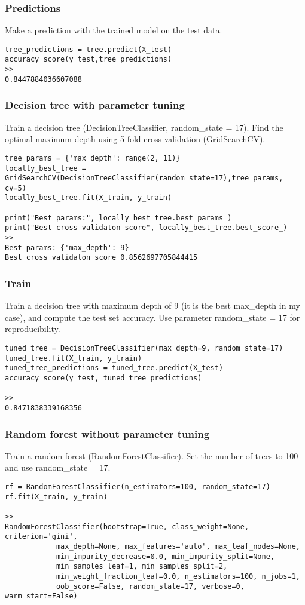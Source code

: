 \begin{frame}[fragile]\frametitle{Predictions}	
Make a prediction with the trained model on the test data.
\begin{lstlisting}
tree_predictions = tree.predict(X_test) 
accuracy_score(y_test,tree_predictions)
>>
0.8447884036607088
\end{lstlisting}
\end{frame}


\begin{frame}[fragile]\frametitle{Decision tree with parameter tuning}	
Train a decision tree (DecisionTreeClassifier, random\_state = 17). Find the optimal maximum depth using 5-fold cross-validation (GridSearchCV).
\begin{lstlisting}
tree_params = {'max_depth': range(2, 11)}
locally_best_tree = GridSearchCV(DecisionTreeClassifier(random_state=17),tree_params, cv=5)                  
locally_best_tree.fit(X_train, y_train)

print("Best params:", locally_best_tree.best_params_)
print("Best cross validaton score", locally_best_tree.best_score_)
>>
Best params: {'max_depth': 9}
Best cross validaton score 0.8562697705844415
\end{lstlisting}
\end{frame}

\begin{frame}[fragile]\frametitle{Train}	
Train a decision tree with maximum depth of 9 (it is the best max\_depth in my case), and compute the test set accuracy. Use parameter random\_state = 17 for reproducibility.
\begin{lstlisting}
tuned_tree = DecisionTreeClassifier(max_depth=9, random_state=17)
tuned_tree.fit(X_train, y_train)
tuned_tree_predictions = tuned_tree.predict(X_test)
accuracy_score(y_test, tuned_tree_predictions)

>>
0.8471838339168356
\end{lstlisting}
\end{frame}


\begin{frame}[fragile]\frametitle{Random forest without parameter tuning}	
Train a random forest (RandomForestClassifier). Set the number of trees to 100 and use random\_state = 17.
\begin{lstlisting}
rf = RandomForestClassifier(n_estimators=100, random_state=17)
rf.fit(X_train, y_train)

>>
RandomForestClassifier(bootstrap=True, class_weight=None, criterion='gini',
            max_depth=None, max_features='auto', max_leaf_nodes=None,
            min_impurity_decrease=0.0, min_impurity_split=None,
            min_samples_leaf=1, min_samples_split=2,
            min_weight_fraction_leaf=0.0, n_estimators=100, n_jobs=1,
            oob_score=False, random_state=17, verbose=0, warm_start=False)
\end{lstlisting}
\end{frame}

